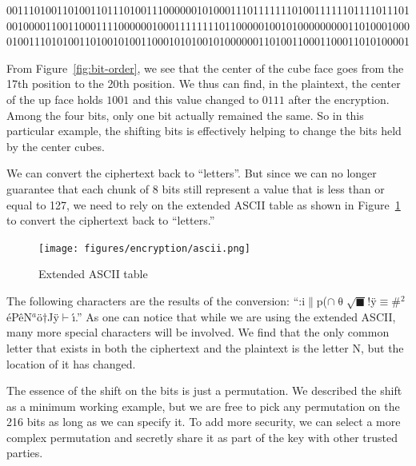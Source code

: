 \begin{center}
    001110100110100110111010011100000010100011101111111010011111101111011101
    001000011001100011110000001000111111110110000010010100000000011010001000
    010011101010011010010100110001010100101000000110100110001100011010100001
\end{center}
From Figure~\ref{fig:bit-order}, we see that the center of the cube face goes from the 17th position to the 20th position. We thus can find, in the plaintext, the center of the up face holds $1001$ and this value changed to $0111$ after the encryption. Among the four bits, only one bit actually remained the same. So in this particular example, the shifting bits is effectively helping to change the bits held by the center cubes.
\par We can convert the ciphertext back to ``letters''. But since we can no longer guarantee that each chunk of 8 bits still represent a value that is less than or equal to 127, we need to rely on the extended ASCII table as shown in Figure~\ref{fig:ascii} to convert the ciphertext back to ``letters.'' 
\begin{figure}
    \centering
    \texttt{[image: figures/encryption/ascii.png]}
    \caption{Extended ASCII table}
    \label{fig:ascii}
\end{figure}
The following characters are the results of the conversion: ``:i$\|$p($\cap\uptheta\surd\blacksquare$!\"{y}$\equiv$\#$^2$\'{e}P\;\^{e}N$^a$\"{o}$\dagger$J\;\"{y}$\vdash$\'{\i}.'' As one can notice that while we are using the extended ASCII, many more special characters will be involved. We find that the only common letter that exists in both the ciphertext and the plaintext is the letter N, but the location of it has changed. 
\par The essence of the shift on the bits is just a permutation. We described the shift as a minimum working example, but we are free to pick any permutation on the 216 bits as long as we can specify it. To add more security, we can select a more complex permutation and secretly share it as part of the key with other trusted parties.

